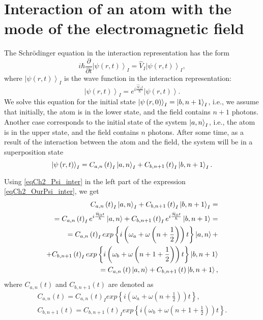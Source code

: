 \section{Interaction of an atom with the mode of the electromagnetic field}
The Schrödinger equation in the interaction representation has the form
\begin{equation}
i \hbar \frac{\partial}{\partial t} \left|\psi\left(r, t\right)\right>_I
= \hat{V}_I \left|\psi\left(r, t\right)\right>_I,
\label{eqCh2_Shredinger_inter}
\end{equation}
where 
\(
\left|\psi\left(r, t\right)\right>_I
\)
is the wave function in the interaction representation:
\begin{equation}
\left|\psi\left(r, t\right)\right>_I = e^{i \frac{\hat{\mathcal{H}}_0
    t}{\hbar}}
\left|\psi\left(r, t\right)\right>.
\label{eqCh2_Psi_inter}
\end{equation}
We solve this equation for the initial state 
$\left|\psi\left(r, 0\right)\right>_I = \ket{b, n + 1}_I$, i.e., 
we assume that initially, the atom is in the lower state, and the field contains $n + 1$ photons. Another case corresponds to the initial state of the system  
$\ket{a, n}_I$, i.e., the atom is in the upper state, and the field contains $n$ photons. After some time, as a result of the interaction between the atom and the field, the system will be in a superposition state  
\begin{equation}
\left|\psi\left(r, t\right)\right>_I = 
C_{a,n}\left(t\right)_I\ket{a, n}_I +
C_{b,n+1}\left(t\right)_I\ket{b, n + 1}_I.
\label{eqCh2_OurPsi_inter}
\end{equation}

Using \eqref{eqCh2_Psi_inter} in the left part of the expression
\eqref{eqCh2_OurPsi_inter}, we get 
\begin{eqnarray}
C_{a,n}\left(t\right)_I\ket{a, n}_I +
C_{b,n+1}\left(t\right)_I\ket{b, n + 1}_I =
\nonumber \\
= C_{a,n}\left(t\right)_I e^{i \frac{\hat{\mathcal{H}}_0
    t}{\hbar}} \ket{a, n} +
C_{b,n+1}\left(t\right)_I e^{i \frac{\hat{\mathcal{H}}_0
    t}{\hbar}} \ket{b, n + 1} = 
\nonumber \\
=
C_{a,n}\left(t\right)_I exp\left\{i \left(
 \omega_a +  \omega 
\left( n + \frac{1}{2}\right) 
\right) t
\right\} \ket{a, n} +
\nonumber \\
+
C_{b,n+1}\left(t\right)_I exp\left\{i 
\left(
\omega_b +  \omega 
\left( n + 1 + \frac{1}{2}\right) 
\right)
    t \right\} \ket{b, n + 1}
\nonumber \\
=
C_{a,n}\left(t\right) \ket{a, n} +
C_{b,n+1}\left(t\right) \ket{b, n + 1},
\nonumber
\end{eqnarray}
where $C_{a,n}\left(t\right)$ and $C_{b,n+1}\left(t\right)$ are denoted as 
\begin{eqnarray}
C_{a,n}\left(t\right) = 
C_{a,n}\left(t\right)_I exp\left\{i 
\left(
\omega_a +  \omega 
\left( n + \frac{1}{2}\right) 
\right) 
    t \right\},
\nonumber \\
C_{b,n+1}\left(t\right) =
C_{b,n+1}\left(t\right)_I exp\left\{i \left(
\omega_b + \omega 
\left( n + 1 + \frac{1}{2}\right) 
\right)
    t\right\}.
\nonumber
\end{eqnarray}


